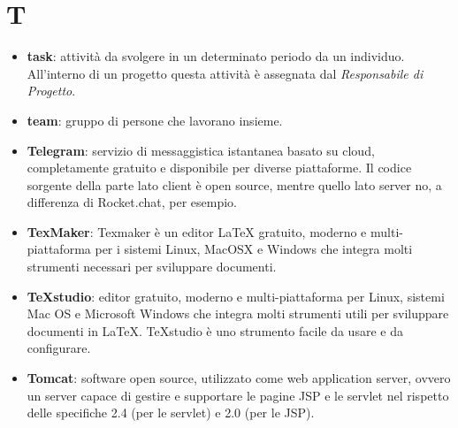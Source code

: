 \section{T}
\begin{itemize}
	\item \textbf{task}: attività da svolgere in un determinato periodo da un individuo. All'interno di un progetto questa attività è assegnata dal \textit{Responsabile di Progetto}.
	\item \textbf{team}: gruppo di persone che lavorano insieme.
	\item \textbf{Telegram}: servizio di messaggistica istantanea basato su cloud, completamente gratuito e disponibile per diverse piattaforme. Il codice sorgente della parte lato client è open source, mentre quello lato server no, a differenza di Rocket.chat, per esempio.
	\item \textbf{TexMaker}: Texmaker è un editor LaTeX gratuito, moderno e multi-piattaforma per i sistemi Linux, MacOSX e Windows che integra molti strumenti necessari per sviluppare documenti.
	\item \textbf{TeXstudio}: editor gratuito, moderno e multi-piattaforma per Linux, sistemi Mac OS e Microsoft Windows che integra molti strumenti utili per sviluppare documenti in \LaTeX. TeXstudio è uno strumento facile da usare e da configurare.
	\item \textbf{Tomcat}: software open source, utilizzato come web application server, ovvero un server capace di gestire e supportare le pagine JSP e le servlet nel rispetto delle specifiche 2.4 (per le servlet) e 2.0 (per le JSP).
\end{itemize}

